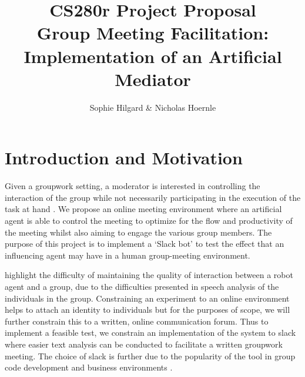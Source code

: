 \documentclass[final,authoryear,11pt,times]{elsarticle}
\begin{document}
\begin{frontmatter}

\title{CS280r Project Proposal \\ Group Meeting Facilitation: Implementation of an Artificial Mediator}


\author{Sophie Hilgard \& Nicholas Hoernle}


\end{frontmatter}

\section{Introduction and Motivation}
	\label{sec:introduction-motivation}
	Given a groupwork setting, a moderator is interested in controlling the interaction of the group while not necessarily participating in the execution of the task at hand \citep{short2015towards}. We propose an online meeting environment where an artificial agent is able to control the meeting to optimize for the flow and productivity of the meeting whilst also aiming to engage the various group members. The purpose of this project is to implement a `Slack bot' to test the effect that an influencing agent may have in a human group-meeting environment.

	\citet{matsuyama2015four} highlight the difficulty of maintaining the quality of interaction between a robot agent and a group, due to the difficulties presented in speech analysis of the individuals in the group. Constraining an experiment to an online environment helps to attach an identity to individuals but for the purposes of scope, we will further constrain this to a written, online communication forum. Thus to implement a feasible test, we constrain an implementation of the system to slack where easier text analysis can be conducted to facilitate a written groupwork meeting. The choice of slack is further due to the popularity of the tool in group code development and business environments \citep{jeffrey2016scientists}\citep{lebeuf2017software}.
\end{document}

